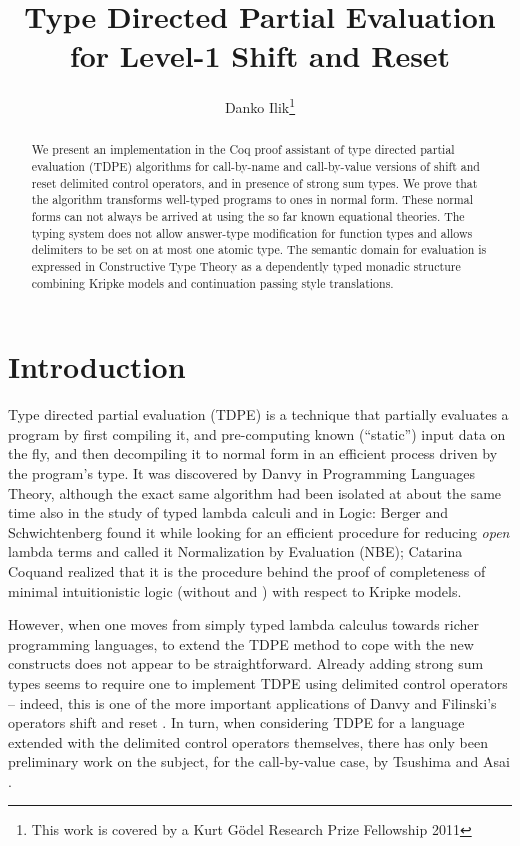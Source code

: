 \documentclass{eptcs}
\title{Type Directed Partial Evaluation for Level-1 Shift and Reset}
\author{Danko Ilik\thanks{This work is covered by a Kurt G\"odel Research Prize Fellowship 2011}
  \institute{Laboratory for Complex Systems and Networks\\Macedonian Academy of Sciences and Arts\\Skopje, Macedonia}
  \email{danko.ilik@gmail.com}
}
\theoremstyle{definition}
\theoremstyle{plain}
\theoremstyle{remark}
\begin{document}
\maketitle

\begin{abstract} 
  We present an implementation in the Coq proof assistant of type
  directed partial evaluation (TDPE) algorithms for call-by-name and
  call-by-value versions of shift and reset delimited control
  operators, and in presence of strong sum types. We prove that the
  algorithm transforms well-typed programs to ones in normal
  form. These normal forms can not always be arrived at using the so
  far known equational theories. The typing system does not allow
  answer-type modification for function types and allows delimiters to
  be set on at most one atomic type. The semantic domain for
  evaluation is expressed in Constructive Type Theory as a dependently
  typed monadic structure combining Kripke models and continuation
  passing style translations.  
\end{abstract}


\section{Introduction}

Type directed partial evaluation (TDPE) is a technique that partially evaluates a program by first compiling it, and pre-computing known (``static'') input data on the fly, and then decompiling it to normal form in an efficient process driven by the program's type. It was discovered by Danvy \cite{Danvy1999} in Programming Languages Theory, although the exact same algorithm had been isolated at about the same time also in the study of typed lambda calculi and in Logic: Berger and Schwichtenberg \cite{BergerS1991} found it while looking for an efficient procedure for reducing \emph{open} lambda terms and called it Normalization by Evaluation (NBE); Catarina Coquand \cite{CCoquand1993} realized that it is the procedure behind the proof of completeness of minimal intuitionistic logic (without  and ) with respect to Kripke models.

However, when one moves from simply typed lambda calculus towards richer programming languages, to extend the TDPE method to cope with the new constructs does not appear to be straightforward. Already adding strong sum types seems to require one to implement TDPE using delimited control operators -- indeed, this is one of the more important applications of Danvy and Filinski's operators shift and reset \cite{DanvyF1990}. In turn, when considering TDPE for a language extended with the delimited control operators themselves, there has only been preliminary work on the subject, for the call-by-value case, by Tsushima and Asai \cite{TsushimaAsai2009}.
\end{document}
